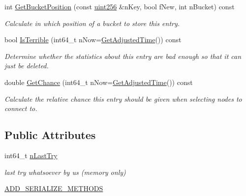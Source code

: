 \begin{DoxyCompactItemize}
int \mbox{\hyperlink{class_c_addr_info_a3a133ffb3fbf67cbeb5f4bc683fa9126}{Get\+Bucket\+Position}} (const \mbox{\hyperlink{classuint256}{uint256}} \&n\+Key, bool f\+New, int n\+Bucket) const
\begin{DoxyCompactList}\small\item\em Calculate in which position of a bucket to store this entry. \end{DoxyCompactList}\item 
bool \mbox{\hyperlink{class_c_addr_info_a600725db90b879aee92128a3409af8aa}{Is\+Terrible}} (int64\+\_\+t n\+Now=\mbox{\hyperlink{timedata_8h_a09f81b9c7650f898cf3cf305b87547e6}{Get\+Adjusted\+Time}}()) const
\begin{DoxyCompactList}\small\item\em Determine whether the statistics about this entry are bad enough so that it can just be deleted. \end{DoxyCompactList}\item 
double \mbox{\hyperlink{class_c_addr_info_af6788fe5a5364e63896ab9dedb8e5d40}{Get\+Chance}} (int64\+\_\+t n\+Now=\mbox{\hyperlink{timedata_8h_a09f81b9c7650f898cf3cf305b87547e6}{Get\+Adjusted\+Time}}()) const
\begin{DoxyCompactList}\small\item\em Calculate the relative chance this entry should be given when selecting nodes to connect to. \end{DoxyCompactList}\end{DoxyCompactItemize}
\subsection*{Public Attributes}
\begin{DoxyCompactItemize}
\item 
int64\+\_\+t \mbox{\hyperlink{class_c_addr_info_a4569955918c204d2edd073456108ddfd}{n\+Last\+Try}}
\begin{DoxyCompactList}\small\item\em last try whatsoever by us (memory only) \end{DoxyCompactList}\item 
\mbox{\hyperlink{class_c_addr_info_a9d5e0b95fa494171e4bffb900094fe2e}{A\+D\+D\+\_\+\+S\+E\+R\+I\+A\+L\+I\+Z\+E\+\_\+\+M\+E\+T\+H\+O\+DS}}
\end{DoxyCompactItemize}
